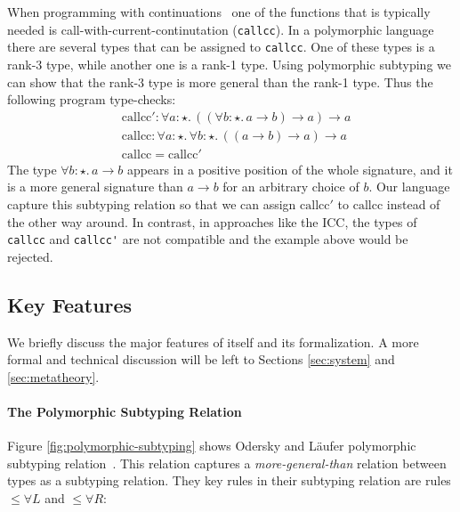When programming with continuations~\cite{} one of the functions that is typically needed
is call-with-current-continutation (\verb|callcc|). In a polymorphic language there are
several types that can be assigned to \verb|callcc|. One of these types is a rank-3 type,
while another one is a rank-1 type. Using polymorphic subtyping we can show that the rank-3
type is more general than the rank-1 type. Thus the following program type-checks:
\begin{align*}
& \mathrm{callcc}' : \forall a : \star.\, ((\forall b : \star.\, a \rightarrow b) \rightarrow a) \rightarrow a \\
& \mathrm{callcc} : \forall a : \star.\, \forall b : \star.\, ((a \rightarrow b) \rightarrow a) \rightarrow a \\
& \mathrm{callcc} = \mathrm{callcc}'
\end{align*}
\noindent The type $\forall b : \star.\, a \rightarrow b$ appears in a positive position
of the whole signature, and it is a more general signature than $a \rightarrow b$
for an arbitrary choice of $b$. Our language capture this subtyping relation so that
we can assign $\mathrm{callcc}'$ to $\mathrm{callcc}$ instead of the other way around.
In contrast, in approaches like the ICC, the types of \verb|callcc| and \verb|callcc'|
are not compatible and the example above would be rejected.

\subsection{Key Features}

We briefly discuss the major features of \name itself and
its formalization. A more formal and technical discussion will be left to
Sections \ref{sec:system} and \ref{sec:metatheory}.

\paragraph{The Polymorphic Subtyping Relation}
Figure \ref{fig:polymorphic-subtyping} shows Odersky and L\"aufer polymorphic
subtyping relation~\cite{odersky1996putting}.
This relation captures a \emph{more-general-than} relation between
types as a subtyping relation. They key rules in their
subtyping relation are rules $\le\forall L$ and $\le\forall R$:


